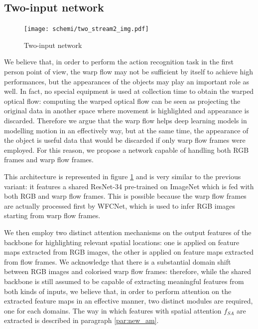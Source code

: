 \documentclass[10pt,twocolumn,letterpaper]{article}
\begin{document}
\subsection{Two-input network}
\label{par:our_two_stream}

\begin{figure}
	\begin{center}
		\texttt{[image: schemi/two\_stream2\_img.pdf]}		
	\end{center}
	\caption{Two-input network}
	\label{fig:TwoStream}
\end{figure}

We believe that, in order to perform the action recognition task in the first person point of view, the warp flow may not be sufficient by itself to achieve high performances, but the appearances of the objects may play an important role as well. In fact, no special equipment is used at collection time to obtain the warped optical flow: computing the warped optical flow can be seen as projecting the original data in another space where movement is highlighted and appearance is discarded. Therefore we argue that the warp flow helps deep learning models in modelling motion in an effectively way, but at the same time, the appearance of the object is useful data that would be discarded if only warp flow frames were employed. For this reason, we propose a network capable of handling both RGB frames and warp flow frames.

This architecture is represented in figure \ref{fig:TwoStream} and is very similar to the previous variant: it features a shared ResNet-34 pre-trained on ImageNet which is fed with both RGB and warp flow frames. This is possible because the warp flow frames are actually processed first by WFCNet, which is used to infer RGB images starting from warp flow frames.

We then employ two distinct attention mechanisms on the output features of the backbone for highlighting relevant spatial locations: one is applied on feature maps extracted from RGB images, the other is applied on feature maps extracted from flow frames. We acknowledge that there is a substantial domain shift between RGB images and colorised warp flow frames: therefore, while the shared backbone is still assumed to be capable of extracting meaningful features from both kinds of inputs, we believe that, in order to perform attention on the extracted feature maps in an effective manner, two distinct modules are required, one for each domains. The way in which features with spatial attention $f_{SA}$ are extracted is described in paragraph \ref{par:new_am}.
\end{document}

